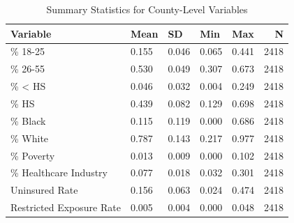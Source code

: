 \begin{table}

\caption{\label{tab:tab:summary_stats}Summary Statistics for County-Level Variables}
\centering
\begin{tabular}[t]{lllllr}
\toprule
Variable & Mean & SD & Min & Max & N\\
\midrule
\% 18-25 & 0.155 & 0.046 & 0.065 & 0.441 & 2418\\
\% 26-55 & 0.530 & 0.049 & 0.307 & 0.673 & 2418\\
\% < HS & 0.046 & 0.032 & 0.004 & 0.249 & 2418\\
\% HS & 0.439 & 0.082 & 0.129 & 0.698 & 2418\\
\% Black & 0.115 & 0.119 & 0.000 & 0.686 & 2418\\
\addlinespace
\% White & 0.787 & 0.143 & 0.217 & 0.977 & 2418\\
\% Poverty & 0.013 & 0.009 & 0.000 & 0.102 & 2418\\
\% Healthcare Industry & 0.077 & 0.018 & 0.032 & 0.301 & 2418\\
Uninsured Rate & 0.156 & 0.063 & 0.024 & 0.474 & 2418\\
Restricted Exposure Rate & 0.005 & 0.004 & 0.000 & 0.048 & 2418\\
\bottomrule
\end{tabular}
\end{table}
